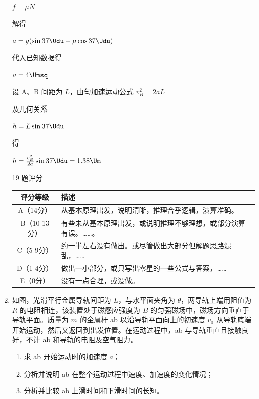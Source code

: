 \documentclass[\gkver]{gaokaozhenti}
\begin{document}
\begin{enumerate}
{$f = \mu N$

解得

$a = g(\sin37\Udu - \mu\cos37\Udu)$

代入已知数据得

$a = 4\Umsq$

设 A、B 间距为 $L$，由匀加速运动公式 $v_{B}^{2} = 2aL$

及几何关系

$h = L\sin37\Udu$

得

$h = \frac{v_{B}^{2}}{2a}\sin37\Udu = 1.38\Um$

19 题评分

\begin{center}
\begin{tabular}{|c|p{10cm}|}
\hline
评分等级 & 描述 \\ \hline
A（14分） & 从基本原理出发，说明清晰，推理合乎逻辑，演算准确。 \\ \hline
B（10-13分） & 有些未从基本原理出发，或说明推理不够理想，或部分演算有误。……。 \\ \hline
C（5-9分） & 约一半左右没有做出。或尽管做出大部分但解题思路混乱，…… \\ \hline
D（1-4分） & 做出一小部分，或只写出零星的一些公式与答案，…… \\ \hline
E（0分） & 没有一点合理，或没做。 \\ \hline
\end{tabular}
\end{center}
}

\item
如图，光滑平行金属导轨间距为 $L$，与水平面夹角为 $\theta$，两导轨上端用阻值为 $R$ 的电阻相连，该装置处于磁感应强度为 $B$ 的匀强磁场中，磁场方向垂直于导轨平面。质量为 $m$ 的金属杆 ab 以沿导轨平面向上的初速度 $v_{0}$ 从导轨底端开始运动，然后又返回到出发位置。在运动过程中，ab 与导轨垂直且接触良好，不计 ab 和导轨的电阻及空气阻力。
\begin{enumerate}
	\item
	求 ab 开始运动时的加速度 $a$；
	\item
	分析并说明 ab 在整个运动过程中速度、加速度的变化情况；
	\item
	分析并比较 ab 上滑时间和下滑时间的长短。
\end{enumerate}
\onepicture[align=right, w=5.41cm]{}
\end{enumerate}
\end{document}
